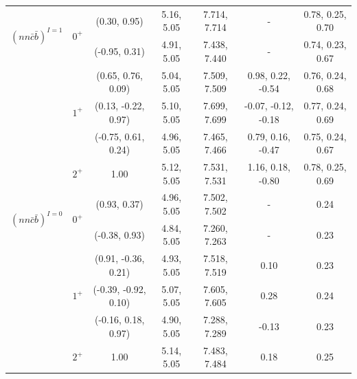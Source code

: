 \documentclass[prt,twocolumn,floatfix,nofootinbib]{revtex4}
\begin{document}
\begin{table}[!htbp]
\begin{tabular}{ccccccc}
        \multirow{2}{*}{${(nn\bar{c}\bar{b})}^{I=1}$}
                        &\multirow{2}{*}{$0^{+}$}
                                    &(0.30, 0.95)           &5.16, 5.05	    &7.714, 7.714	    &-                      &0.78, 0.25, 0.70 \\
                        &           &(-0.95, 0.31)          &4.91, 5.05	    &7.438, 7.440	    &-                      &0.74, 0.23, 0.67 \\
                        &\multirow{3}{*}{$1^{+}$}
                                    &(0.65, 0.76, 0.09)     &5.04, 5.05	    &7.509, 7.509	    &0.98, 0.22, -0.54      &0.76, 0.24, 0.68 \\
                        &           &(0.13, -0.22, 0.97)    &5.10, 5.05	    &7.699, 7.699	    &-0.07, -0.12, -0.18    &0.77, 0.24, 0.69 \\
                        &           &(-0.75, 0.61, 0.24)    &4.96, 5.05	    &7.465, 7.466	    &0.79, 0.16, -0.47      &0.75, 0.24, 0.67 \\
                        &$2^{+}$    &1.00                   &5.12, 5.05	    &7.531, 7.531	    &1.16, 0.18, -0.80      &0.78, 0.25, 0.69 \\
        \multirow{2}{*}{${(nn\bar{c}\bar{b})}^{I=0}$}
                        &\multirow{2}{*}{$0^{+}$}
                                    &(0.93, 0.37)           &4.96, 5.05	    &7.502, 7.502	    &-                      &0.24 \\
                        &           &(-0.38, 0.93)          &4.84, 5.05	    &7.260, 7.263	    &-                      &0.23 \\
                        &\multirow{3}{*}{$1^{+}$}
                                    &(0.91, -0.36, 0.21)    &4.93, 5.05	    &7.518, 7.519	    &0.10                   &0.23 \\
                        &           &(-0.39, -0.92, 0.10)   &5.07, 5.05	    &7.605, 7.605	    &0.28                   &0.24 \\
                        &           &(-0.16, 0.18, 0.97)    &4.90, 5.05	    &7.288, 7.289	    &-0.13                  &0.23 \\
                        &$2^{+}$    &1.00                   &5.14, 5.05	    &7.483, 7.484	    &0.18                   &0.25 \\
        \hline\hline
    \end{tabular}
\end{table}
\end{document}
